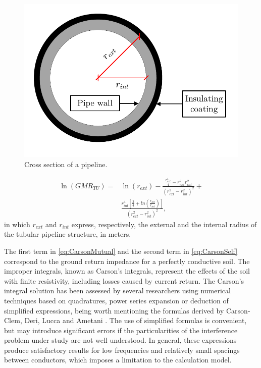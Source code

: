 \documentclass[conference]{IEEEtran}
\begin{document}
\begin{figure}[!t]
	\begin{center}
		\includegraphics[width=.8\columnwidth]{fig/Pipe.pdf}
		\caption{Cross section of a pipeline.}
		\label{fig:Pipe}
	\end{center}
\end{figure}
\begin{equation}\label{eq:GMR}
	\begin{aligned}
		\ln(GMR_{TU})=&\ln(r_{ext})-\frac{\frac{r_{ext}^4}{4}-r_{ext}^2r_{int}^2}{(r_{ext}^2-r_{int}^2)^2}+ \\
		&\frac{r_{int}^4[\frac{3}{4}+ln(\frac{r_{int}}{r_{int}})]}{(r_{ext}^2-r_{int}^2)^2},
	\end{aligned}
\end{equation}
in which $r_{ext}$ and $r_{int}$ express, respectively, the external and the internal radius of the tubular pipeline structure, in meters.

The first term in \eqref{eq:CarsonMutual} and the second term in \eqref{eq:CarsonSelf} correspond to the ground return impedance for a perfectly conductive soil. The improper integrals, known as Carson's integrals, represent the effects of the soil with finite resistivity, including losses caused by current return. The Carson's integral solution has been assessed by several researchers using numerical techniques based on quadratures, power series expansion or deduction of simplified expressions, being worth mentioning the formulas derived by Carson-Clem, Deri, Lucca and Ametani \cite{CIGREWG36,DeriA.Tevan1981,Lucca1994,Ametani2009}. The use of simplified formulas is convenient, but may introduce significant errors if the particularities of the interference problem under study are not well understood. In general, these expressions produce satisfactory results for low frequencies and relatively small spacings between conductors, which imposes a limitation to the calculation model.
\end{document}
